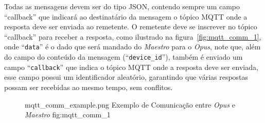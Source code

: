 Todas as mensagens devem ser do tipo JSON, contendo sempre um campo ``callback'' que indicará ao destinatário da mensagem o tópico MQTT
onde a resposta deve ser enviada ao remetente. O remetente deve se inscrever no tópico ``callback'' para receber a resposta, como ilustrado
na figura~\ref{fig:mqtt_comm_1}, onde ``\lstinline{data}'' é o dado que será mandado do \emph{Maestro} para o \emph{Opus}, note que, além do
campo do conteúdo da mensagem (``\lstinline{device_id}''), também é enviado um campo ``\lstinline{callback}'' que indica o tópico MQTT onde a resposta
deve ser enviada, esse campo possui um identificador aleatório, garantindo que várias respostas possam ser recebidas ao mesmo tempo, sem conflitos.
\begin{figure}[h!]
    {mqtt_comm_example.png}
    {Exemplo de Comunicação entre \emph{Opus} e \emph{Maestro}}
    {fig:mqtt_comm_1}
\end{figure}

